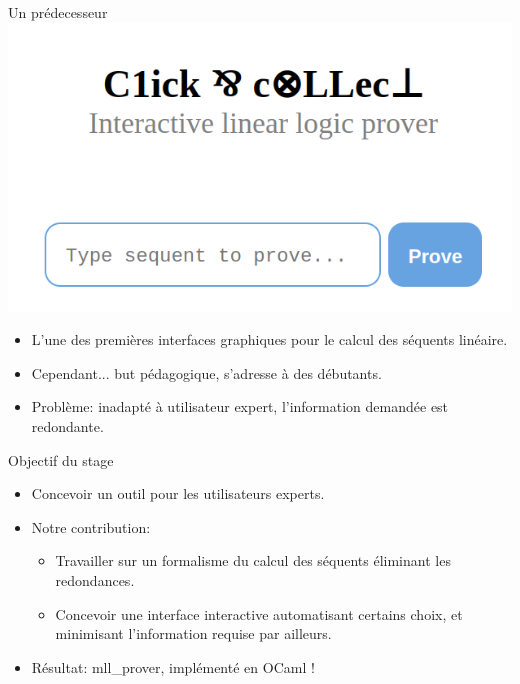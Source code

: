 \documentclass{beamer}
\begin{document}
\begin{frame}{Un prédecesseur}
    \centering
    \includegraphics[scale=0.35]{images/C&C_home.png}

    \pause
    
    \begin{itemize}
        \item L'une des premières interfaces graphiques pour le calcul des séquents linéaire.
            \pause
        \item Cependant... but pédagogique, s'adresse à des débutants.
            \pause
        \item Problème: inadapté à utilisateur expert, l'information demandée est redondante.
    \end{itemize}


\end{frame}

\begin{frame}{Objectif du stage}
    \begin{itemize}
        \item Concevoir un outil pour les utilisateurs experts.
            \pause
        \item Notre contribution:
            \begin{itemize}
                \item Travailler sur un formalisme du calcul des séquents éliminant les redondances.
                
                \item Concevoir une interface interactive automatisant certains choix, et minimisant l'information requise par ailleurs.
            \end{itemize}
            \pause
        \item Résultat: mll\_prover, implémenté en OCaml !
    \end{itemize}
\end{frame}
\end{document}
